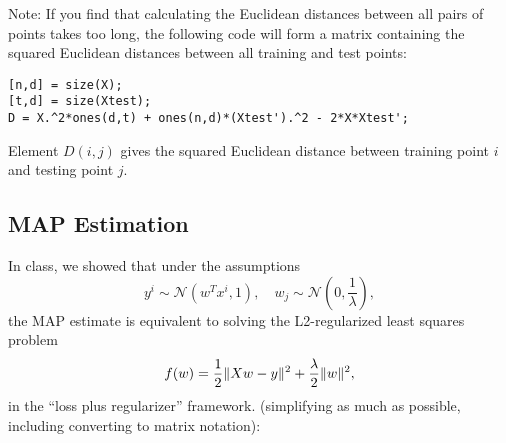 Note:  If you find that calculating the Euclidean distances between all pairs of points takes too long, the following code will form a matrix containing the squared Euclidean distances between all training and test points:
\begin{verbatim}
[n,d] = size(X);
[t,d] = size(Xtest);
D = X.^2*ones(d,t) + ones(n,d)*(Xtest').^2 - 2*X*Xtest';
\end{verbatim}
Element $D(i,j)$ gives the squared Euclidean distance between training point $i$ and testing point $j$.




\subsection{MAP Estimation}

In class, we showed that under the assumptions
\[
y^i \sim \mathcal{N}(w^Tx^i,1), \quad w_j \sim \mathcal{N}\left(0,\frac{1}{\lambda}\right),
\]
the MAP estimate is equivalent to solving the L2-regularized least squares problem
\[
f(w) = \frac{1}{2}\|Xw - y\|^2 + \frac \lambda 2 \|w\|^2,
\]
in the ``loss plus regularizer'' framework.
 (simplifying as much as possible, including converting to matrix notation):

